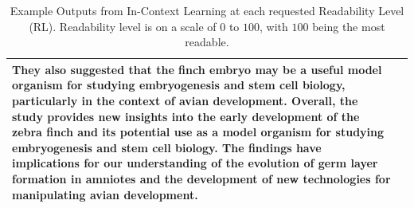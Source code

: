 \begin{table}[]
\begin{tabular}{l|p{}}
They also suggested that the finch embryo may be a useful model organism for studying embryogenesis and stem cell biology, particularly in the context of avian development.  Overall, the study provides new insights into the early development of the zebra finch and its potential use as a model organism for studying embryogenesis and stem cell biology. The findings have implications for our understanding of the evolution of germ layer formation in amniotes and the development of new technologies for manipulating avian development. \\ \hline
\end{tabular}
\caption{Example Outputs from In-Context Learning at each requested Readability Level (RL). Readability level is on a scale of $0$ to $100$, with $100$ being the most readable.}\label{tab:icl-ex-outputs}
\end{table}

